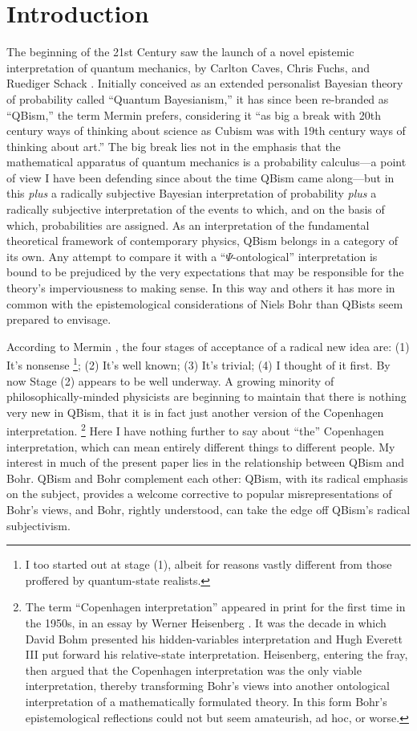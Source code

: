 \documentclass[12pt]{article}
\begin{document}
\section{Introduction}
The beginning of the 21st Century saw the launch of a novel epistemic interpretation of quantum mechanics, by {Carlton Caves}, {Chris Fuchs}, and {Ruediger Schack} \cite{CFS2002}. Initially conceived as an extended personalist Bayesian theory of probability called {``Quantum Bayesianism},'' it has since been re-branded as ``QBism,'' the term Mermin \cite{MerminQBnotCop} prefers, considering it ``as big a break with 20th century ways of thinking about science as Cubism was with 19th century ways of thinking about art.'' The big break lies not in the emphasis that the mathematical apparatus of quantum mechanics is a probability calculus---a point of view I have been defending since about the time QBism came along---but in this \emph{plus} a radically subjective Bayesian interpretation of probability \emph{plus} a radically subjective interpretation of the events to which, and on the basis of which, probabilities are assigned. As an interpretation of the fundamental theoretical framework of contemporary physics, QBism belongs in a category of its own. Any attempt to compare it with a \hbox{``$\Psi$-ontological''} interpretation is bound to be prejudiced by the very expectations that may be responsible for the theory's imperviousness to making sense. In this way and others it has more in common with the epistemological considerations of Niels Bohr than QBists seem prepared to envisage.

According to Mermin \cite{MerminQBnotCop}, the four stages of acceptance of a radical new idea are: (1) It's nonsense%
\footnote{I too started out at stage (1), albeit for reasons vastly different from those proffered by quantum-state realists.};
(2) It's well known; (3) It's trivial; (4) I thought of it first. By now Stage (2) appears to be well underway. A growing minority of philosophically-minded physicists are beginning to maintain that there is nothing very new in QBism, that it is in fact just another version of the Copenhagen interpretation.%
\footnote{The term ``Copenhagen interpretation'' appeared in print for the first time in the 1950s, in an essay by Werner Heisenberg \cite{Heisenberg1955}.  It was the decade in which David Bohm \cite{BohmHV} presented his hidden-variables interpretation and Hugh Everett III \cite{EverettRSF} put forward his relative-state interpretation. Heisenberg, entering the fray, then argued that the Copenhagen interpretation was the only viable interpretation, thereby transforming Bohr's views into another ontological interpretation of a mathematically formulated theory. In this form Bohr's epistemological reflections could not but seem amateurish, ad hoc, or worse.}
Here I have nothing further to say about ``the'' Copenhagen interpretation, which can mean entirely different things to different people. My interest in much of the present paper lies in the relationship between QBism and Bohr. QBism and Bohr complement each other: QBism, with its radical emphasis on the subject, provides a welcome corrective to popular misrepresentations of Bohr's views, and Bohr, rightly understood, can take the edge off QBism's radical subjectivism.
\end{document}
